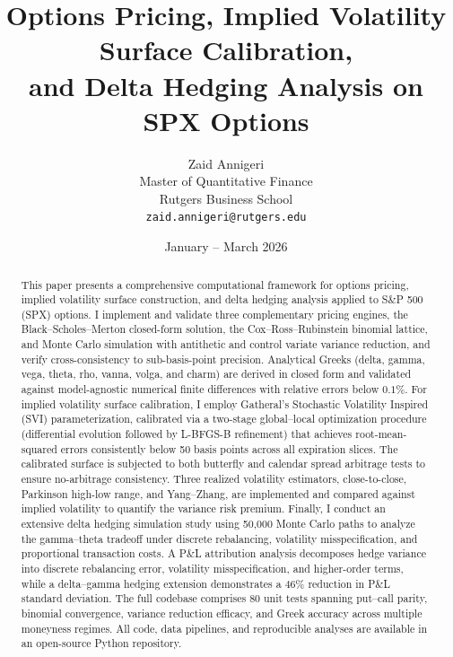 \documentclass[11pt,a4paper]{article}
\title{%
    \textbf{Options Pricing, Implied Volatility Surface Calibration, \\
    and Delta Hedging Analysis on SPX Options}
}
\author{
    Zaid Annigeri \\
    Master of Quantitative Finance \\
    Rutgers Business School \\
    \texttt{zaid.annigeri@rutgers.edu}
}
\date{January -- March 2026}
\begin{document}

\maketitle


\begin{abstract}
\normalsize
This paper presents a comprehensive computational framework for options pricing, implied volatility surface construction, and delta hedging analysis applied to S\&P 500 (SPX) options. I implement and validate three complementary pricing engines, the Black--Scholes--Merton closed-form solution, the Cox--Ross--Rubinstein binomial lattice, and Monte Carlo simulation with antithetic and control variate variance reduction, and verify cross-consistency to sub-basis-point precision. Analytical Greeks (delta, gamma, vega, theta, rho, vanna, volga, and charm) are derived in closed form and validated against model-agnostic numerical finite differences with relative errors below $0.1\%$. For implied volatility surface calibration, I employ Gatheral's Stochastic Volatility Inspired (SVI) parameterization, calibrated via a two-stage global--local optimization procedure (differential evolution followed by L-BFGS-B refinement) that achieves root-mean-squared errors consistently below 50 basis points across all expiration slices. The calibrated surface is subjected to both butterfly and calendar spread arbitrage tests to ensure no-arbitrage consistency. Three realized volatility estimators, close-to-close, Parkinson high-low range, and Yang--Zhang, are implemented and compared against implied volatility to quantify the variance risk premium. Finally, I conduct an extensive delta hedging simulation study using 50,000 Monte Carlo paths to analyze the gamma--theta tradeoff under discrete rebalancing, volatility misspecification, and proportional transaction costs. A P\&L attribution analysis decomposes hedge variance into discrete rebalancing error, volatility misspecification, and higher-order terms, while a delta--gamma hedging extension demonstrates a 46\% reduction in P\&L standard deviation. The full codebase comprises 80 unit tests spanning put--call parity, binomial convergence, variance reduction efficacy, and Greek accuracy across multiple moneyness regimes. All code, data pipelines, and reproducible analyses are available in an open-source Python repository.
\end{abstract}
\end{document}
